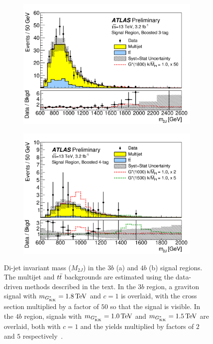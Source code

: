 \begin{figure}[h!]
  \centering
  \captionsetup{justification=centering}

   \begin{subfigure}[t]{0.5\textwidth}
        \centering
        \includegraphics[width=\textwidth]{figures/3b_signal}
        \caption{}
    \end{subfigure}%
    \begin{subfigure}[t]{0.5\textwidth}
        \centering
        \includegraphics[width=\textwidth]{figures/4b_signal}
        \caption{}
    \end{subfigure}

   \caption{Di-jet invariant mass ($M_{2J}$) in the $3b$ (a) and $4b$ (b) signal regions. The multijet and $t\bar{t}$ backgrounds are estimated using the data-driven methods described in the text. In the $3b$ region, a graviton signal with $m_{\Gkk} = 1.8 \TeV$ and $c=1$ is overlaid, with the cross section multiplied by a factor of $50$ so that the signal is visible. In the $4b$ region, signals with $m_{\Gkk} = 1.0 \TeV$ and $m_{\Gkk} = 1.5 \TeV$ are overlaid, both with $c = 1$ and the yields multiplied by factors of $2$ and $5$ respectively~\cite{4bconf}.}
  \label{fig:BoostedResults}
\end{figure}


